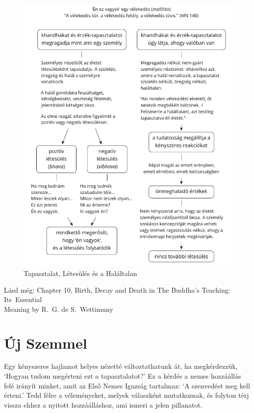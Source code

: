 \begin{figure}[h]
\caption{Tapasztalat, Létesülés és a Haláltalan}\label{fig-experience-becoming-deathless}
\bigskip
\includegraphics[width=\linewidth-2mm]{./manuscript/tex/diagrams/experience-becoming-deathless-hu.pdf}
\end{figure}

{\noindent\footnotesize
Lásd még: Chapter 10, Birth, Decay and Death in The Buddha's Teaching: Its~Essential\\
Meaning by R.~G. de S.~Wettimuny
\par}

\clearpage
\normalpagelayout

\section{Új Szemmel}


\noindent Egy kényszeres hajlamot helyes nézetté változtathatunk át, ha
megkérdezzük, `Hogyan tudom megérteni ezt a tapasztalatot?' Ez a kérdés
a nemes hozzáállás felé irányít minket, amit az Első Nemes Igazság
tartalmaz: `A szenvedést meg kell érteni.' Tedd félre a véleményeket,
melyek válaszként mutatkoznak, és folyton térj vissza ehhez a nyitott
hozzáálláshoz, ami ismeri a jelen pillanatot.

